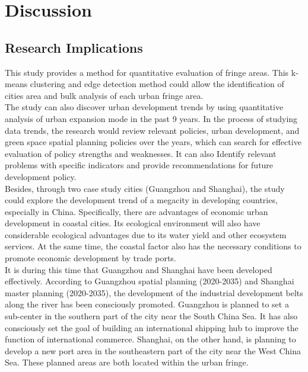 \section{Discussion}

\subsection{Research Implications}
This study provides a method for quantitative evaluation of fringe areas. This k-means clustering and edge detection method could allow the identification of cities area and bulk analysis of each urban fringe area.\\

The study can also discover urban development trends by using quantitative analysis of urban expansion mode in the past 9 years. In the process of studying data trends, the research would review relevant policies, urban development, and green space spatial planning policies over the years, which can search for effective evaluation of policy strengths and weaknesses. It can also Identify relevant problems with specific indicators and provide recommendations for future development policy.\\

Besides, through two case study cities (Guangzhou and Shanghai), the study could explore the development trend of a megacity in developing countries, especially in China. Specifically, there are advantages of economic urban development in coastal cities. Its ecological environment will also have considerable ecological advantages due to its water yield and other ecosystem services. At the same time, the coastal factor also has the necessary conditions to promote economic development by trade ports. \\

It is during this time that Guangzhou and Shanghai have been developed effectively. According to Guangzhou spatial planning (2020-2035) and Shanghai master planning (2020-2035), the development of the industrial development belts along the river has been consciously promoted. Guangzhou is planned to set a sub-center in the southern part of the city near the South China Sea. It has also consciously set the goal of building an international shipping hub to improve the function of international commerce. Shanghai, on the other hand, is planning to develop a new port area in the southeastern part of the city near the West China Sea. These planned areas are both located within the urban fringe. \\

